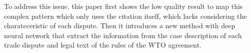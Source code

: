 To address this issue, this paper first shows the low quality result to map this complex pattern which only uses the citation itself, which lacks considering the charateceristic of each dispute.
Then it introduces a new method with deep neural network that extract the information from the case description of each trade dispute and legal text of the rules of the WTO agreement.

